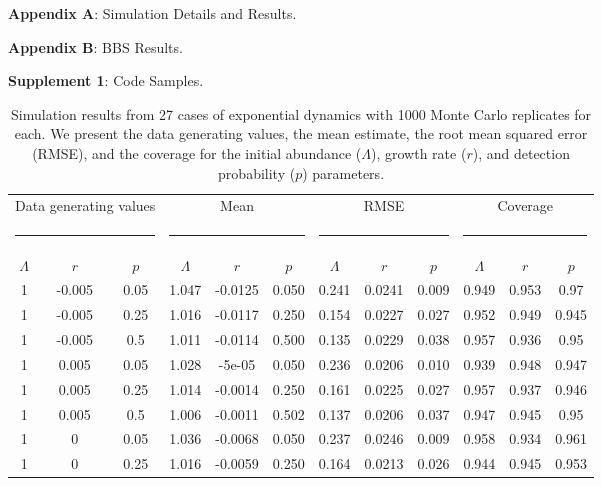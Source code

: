 \documentclass[12pt,english]{article}
\begin{document}
\begin{spacing}{1.9}
\begin{flushleft}


\begin{center}
\noindent{}\textbf{Appendix A}: Simulation Details and Results.

\noindent{}\textbf{Appendix B}: BBS Results.

\noindent{}\textbf{Supplement 1}: Code Samples.
\end{center}

\newpage


\clearpage

\begin{table}[htb]
  \centering
  \footnotesize
  \caption{Simulation results from 27 cases of exponential dynamics with 1000 Monte Carlo replicates for each.
We present the data generating values, the mean estimate, the root mean squared error (RMSE), and the coverage
for the initial abundance ($\Lambda$), growth rate ($r$), and detection probability ($p$) parameters.}
  \begin{tabular}{cccccccccccc}
    \hline
    \multicolumn{3}{c}{Data generating values}&
    \multicolumn{3}{c}{Mean} &
    \multicolumn{3}{c}{RMSE} &
    \multicolumn{3}{c}{Coverage} \\
    \multicolumn{3}{c}{\rule{4cm}{1pt}} &
    \multicolumn{3}{c}{\rule{4cm}{1pt}} &
    \multicolumn{3}{c}{\rule{4cm}{1pt}} &
    \multicolumn{3}{c}{\rule{4cm}{1pt}} \\
    $\Lambda$ & $r$ & $p$ & $\Lambda$ & $r$ & $p$ & $\Lambda$ & $r$ &
    $p$ & $\Lambda$ & $r$ & $p$ \\
    \hline
1	&-0.005	&0.05	&1.047	&-0.0125	&0.050	&0.241	&0.0241	&0.009	&0.949	&0.953	&0.97\\
1	&-0.005	&0.25	&1.016	&-0.0117	&0.250	&0.154	&0.0227	&0.027	&0.952	&0.949	&0.945\\
1	&-0.005	&0.5	&1.011	&-0.0114	&0.500	&0.135	&0.0229	&0.038	&0.957	&0.936	&0.95\\
1	&0.005	&0.05	&1.028  &-5e-05	      &0.050	&0.236	&0.0206	&0.010	&0.939	&0.948	&0.947\\
1	&0.005	&0.25	&1.014	&-0.0014	&0.250	&0.161	&0.0225	&0.027	&0.957	&0.937	&0.946\\
1	&0.005	&0.5	&1.006	&-0.0011	&0.502	&0.137	&0.0206	&0.037	&0.947	&0.945	&0.95\\
1	&0	&0.05	&1.036		&-0.0068	&0.050	&0.237	&0.0246	&0.009	&0.958	&0.934	&0.961\\
1	&0	&0.25	&1.016		&-0.0059	&0.250	&0.164	&0.0213	&0.026	&0.944	&0.945	&0.953\\

\end{tabular}
\end{table}
\end{flushleft}
\end{spacing}
\end{document}
